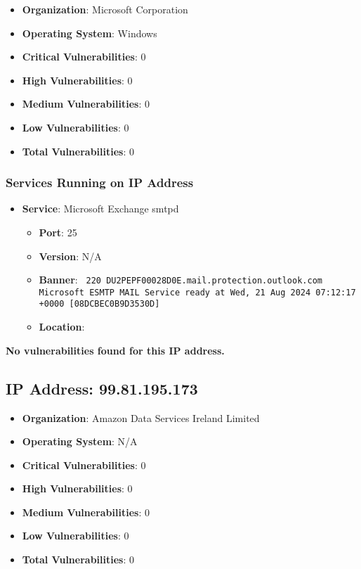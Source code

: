 \documentclass{article}
\begin{document}
\begin{itemize}
    \item \textbf{Organization}: Microsoft Corporation
    \item \textbf{Operating System}:  Windows 
    \item \textbf{Critical Vulnerabilities}: 0
    \item \textbf{High Vulnerabilities}: 0
    \item \textbf{Medium Vulnerabilities}: 0
    \item \textbf{Low Vulnerabilities}: 0
    \item \textbf{Total Vulnerabilities}: 0
\end{itemize}

\subsubsection*{Services Running on IP Address}

\begin{itemize}
    
        \item \textbf{Service}: Microsoft Exchange smtpd
        \begin{itemize}
            \item \textbf{Port}: 25
            \item \textbf{Version}:  N/A 
            \item \textbf{Banner}: \texttt{
                220 DU2PEPF00028D0E.mail.protection.outlook.com Microsoft ESMTP MAIL Service ready at Wed, 21 Aug 2024 07:12:17 +0000 [08DCBEC0B9D3530D]
            }
            \item \textbf{Location}: \href{  }{  }
        \end{itemize}
    
\end{itemize}


\textbf{No vulnerabilities found for this IP address.}




\clearpage



\subsection*{IP Address: 99.81.195.173}

\begin{itemize}
    \item \textbf{Organization}: Amazon Data Services Ireland Limited
    \item \textbf{Operating System}:  N/A 
    \item \textbf{Critical Vulnerabilities}: 0
    \item \textbf{High Vulnerabilities}: 0
    \item \textbf{Medium Vulnerabilities}: 0
    \item \textbf{Low Vulnerabilities}: 0
    \item \textbf{Total Vulnerabilities}: 0
\end{itemize}
\end{document}
